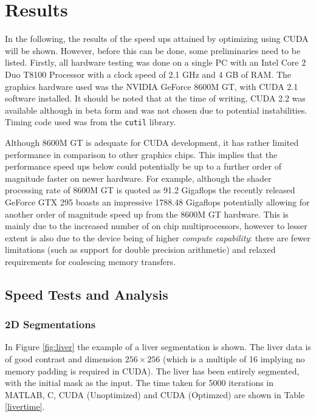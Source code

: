 \chapter{Results}

In the following, the results of the speed ups attained by optimizing using CUDA will be shown. However, before this can be done, some preliminaries need to be listed. Firstly, all hardware testing was done on a single PC with an Intel Core 2 Duo T8100 Processor with a clock speed of 2.1 GHz and 4 GB of RAM. The graphics hardware used was the NVIDIA GeForce 8600M GT, with CUDA 2.1 software installed. It should be noted that at the time of writing, CUDA 2.2 was available although in beta form and was not chosen due to potential instabilities. Timing code used was from the \texttt{cutil} library.

Although 8600M GT is adequate for CUDA development, it has rather limited performance in comparison to other graphics chips. This implies that the performance speed ups below could potentially be up to a further order of magnitude faster on newer hardware. For example, although the shader processing rate of 8600M GT is quoted as 91.2 Gigaflops the recently released GeForce GTX 295 boasts an impressive 1788.48 Gigaflops potentially allowing for another order of magnitude speed up from the 8600M GT hardware. This is mainly due to the increased number of on chip multiprocessors, however to lesser extent is also due to the device being of higher \textit{compute capability}: there are fewer limitations (such as support for double precision arithmetic) and relaxed requirements for coalescing memory transfers.

\section{Speed Tests and Analysis}\label{results}

\subsection{2D Segmentations}


In Figure \ref{fig:liver} the example of a liver segmentation is shown. The liver data is of good contrast and dimension $256\times 256$ (which is a multiple of 16 implying no memory padding is required in CUDA). The liver has been entirely segmented, with the initial mask as the input. The time taken for 5000 iterations in MATLAB, C, CUDA (Unoptimized) and CUDA (Optimzed) are shown in Table \ref{livertime}.

